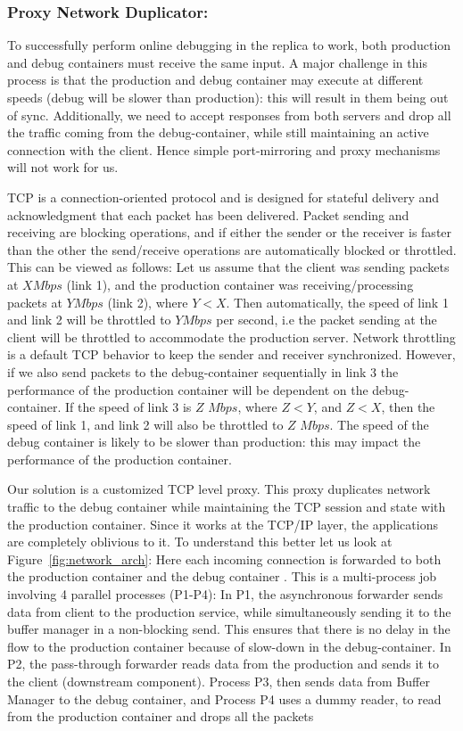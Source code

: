 \subsubsection{Proxy Network Duplicator:} 
\label{sec:parikshanProxyDuplicator}
To successfully perform online debugging in the replica to work, both production and debug containers must receive the same input.
A major challenge in this process is that the production and debug container may execute at different speeds (debug will be slower than production): this will result in them being out of sync.
Additionally, we need to accept responses from both servers and drop all the traffic coming from the debug-container, while still maintaining an active connection with the client.
Hence simple port-mirroring and proxy mechanisms will not work for us. 

TCP is a connection-oriented protocol and is designed for stateful delivery and acknowledgment that each packet has been delivered.
Packet sending and receiving are blocking operations, and if either the sender or the receiver is faster than the other the send/receive operations are automatically blocked or throttled.
This can be viewed as follows: Let us assume that the client was sending packets at $X Mbps$ (link 1), and the production container was receiving/processing packets at $Y Mbps$ (link 2), where $Y<X$. 
Then automatically, the speed of link 1 and link 2 will be throttled to $Y Mbps$ per second, i.e the packet sending at the client will be throttled to accommodate the production server. 
Network throttling is a default TCP behavior to keep the sender and receiver synchronized.
However, if we also send packets to the debug-container sequentially in link 3 the performance of the production container will be dependent on the debug-container. 
If the speed of link 3 is $Z$ $Mbps$, where $Z < Y$, and $Z < X$, then the speed of link 1, and link 2 will also be throttled to $Z$ $Mbps$.
The speed of the debug container is likely to be slower than production: this may impact the performance of the production container.

Our solution is a customized TCP level proxy. 
This proxy duplicates network traffic to the debug container while maintaining the TCP session and state with the production container. 
Since it works at the TCP/IP layer, the applications are completely oblivious to it.
To understand this better let us look at Figure~\ref{fig:network_arch}: Here each incoming connection is forwarded to both the production container and the debug container . 
This is a multi-process job involving 4 parallel processes (P1-P4): In P1, the asynchronous forwarder sends data from client to the production service, while simultaneously sending it to the buffer manager in a non-blocking send.  This ensures that there is no delay in the flow to the production container because of slow-down in the debug-container.
In P2, the pass-through forwarder reads data from the production and sends it to the client (downstream component).
Process P3, then sends data from Buffer Manager to the debug container, and Process P4 uses a dummy reader, to read from the production container and drops all the packets

